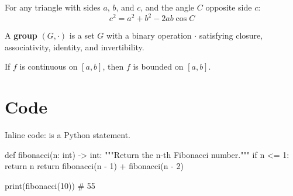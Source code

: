 \documentclass[a4paper,12pt]{article}
\begin{document}


\begin{theorem}
    For any triangle with sides $a$, $b$, and $c$, and the angle $C$ opposite side $c$:
    \[
        c^2 = a^2 + b^2 - 2ab\cos C
    \]
\end{theorem}

\begin{definition}
    A \textbf{group} $(G, \cdot)$ is a set $G$ with a binary operation $\cdot$ satisfying closure, associativity, identity, and invertibility.
\end{definition}

\begin{lemma}
    If $f$ is continuous on $[a, b]$, then $f$ is bounded on $[a, b]$.
\end{lemma}

\section{Code}

Inline code:  is a Python statement.


\begin{codeblock}[python]
def fibonacci(n: int) -> int:
    """Return the n-th Fibonacci number."""
    if n <= 1:
        return n
    return fibonacci(n - 1) + fibonacci(n - 2)

print(fibonacci(10))  # 55
\end{codeblock}
\end{document}
